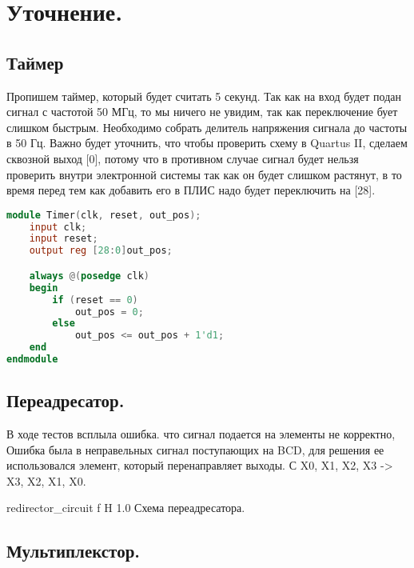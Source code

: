 \documentclass{bmstu}
\begin{document}
	\newpage
		
	\section{Уточнение.}

	\subsection{Таймер}

	\begin{flushleft}
		Пропишем таймер, который будет считать 5 секунд.
		Так как на вход будет подан сигнал с частотой 50 МГц, то мы
		ничего не увидим, так как переключение бует слишком быстрым.
		Необходимо собрать делитель напряжения сигнала до частоты в
		50 Гц. Важно будет уточнить, что чтобы проверить схему в 
		Quartus II, сделаем сквозной выход [0], потому что в 
		противном случае сигнал будет нельзя проверить внутри 
		электронной системы так как он будет слишком растянут, в то 
		время перед тем как добавить его в ПЛИС надо будет переключить на [28].
	
	\end{flushleft}

\begin{lstlisting}[language=verilog,escapeinside=``]
module Timer(clk, reset, out_pos);
	input clk;
	input reset;
	output reg [28:0]out_pos;

	always @(posedge clk)
	begin
		if (reset == 0)
			out_pos = 0;
		else
			out_pos <= out_pos + 1'd1;
	end
endmodule
\end{lstlisting}

	\subsection{Переадресатор.}
	
	\begin{flushleft}	
		В ходе тестов всплыла ошибка. что сигнал подается на элементы не корректно,
		Ошибка была в неправельных сигнал поступающих на BCD,
		для решения ее использовался элемент, который перенаправляет выходы.
		С X0, X1, X2, X3 -> X3, X2, X1, X0.
	\end{flushleft}
	
	{redirector_circuit}
	{f} %
	{H} %
	{1.0\textwidth} %
	{Схема переадресатора.} %
	
	\subsection{Мультиплекстор.}
	
\end{document}
